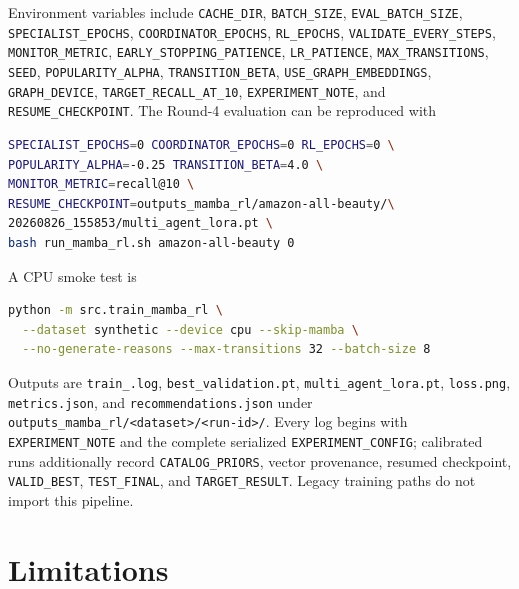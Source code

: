 \documentclass[11pt,a4paper]{article}
\begin{document}
Environment variables include \texttt{CACHE\_DIR},
\texttt{BATCH\_SIZE}, \texttt{EVAL\_BATCH\_SIZE},
\texttt{SPECIALIST\_EPOCHS}, \texttt{COORDINATOR\_EPOCHS},
\texttt{RL\_EPOCHS}, \texttt{VALIDATE\_EVERY\_STEPS},
\texttt{MONITOR\_METRIC}, \texttt{EARLY\_STOPPING\_PATIENCE},
\texttt{LR\_PATIENCE}, \texttt{MAX\_TRANSITIONS}, \texttt{SEED},
\texttt{POPULARITY\_ALPHA}, \texttt{TRANSITION\_BETA},
\texttt{USE\_GRAPH\_EMBEDDINGS}, \texttt{GRAPH\_DEVICE},
\texttt{TARGET\_RECALL\_AT\_10}, \texttt{EXPERIMENT\_NOTE}, and
\texttt{RESUME\_CHECKPOINT}. The Round-4 evaluation can be reproduced with
\begin{lstlisting}[language=bash]
SPECIALIST_EPOCHS=0 COORDINATOR_EPOCHS=0 RL_EPOCHS=0 \
POPULARITY_ALPHA=-0.25 TRANSITION_BETA=4.0 \
MONITOR_METRIC=recall@10 \
RESUME_CHECKPOINT=outputs_mamba_rl/amazon-all-beauty/\
20260826_155853/multi_agent_lora.pt \
bash run_mamba_rl.sh amazon-all-beauty 0
\end{lstlisting}
A CPU smoke test is
\begin{lstlisting}[language=bash]
python -m src.train_mamba_rl \
  --dataset synthetic --device cpu --skip-mamba \
  --no-generate-reasons --max-transitions 32 --batch-size 8
\end{lstlisting}

Outputs are \texttt{train\_<run-id>.log},
\texttt{best\_validation.pt}, \texttt{multi\_agent\_lora.pt},
\texttt{loss.png}, \texttt{metrics.json}, and
\texttt{recommendations.json} under
\texttt{outputs\_mamba\_rl/<dataset>/<run-id>/}. Every log begins with
\texttt{EXPERIMENT\_NOTE} and the complete serialized
\texttt{EXPERIMENT\_CONFIG}; calibrated runs additionally record
\texttt{CATALOG\_PRIORS}, vector provenance, resumed checkpoint,
\texttt{VALID\_BEST}, \texttt{TEST\_FINAL}, and
\texttt{TARGET\_RESULT}. Legacy training paths do not import this pipeline.

\section{Limitations}
\end{document}
